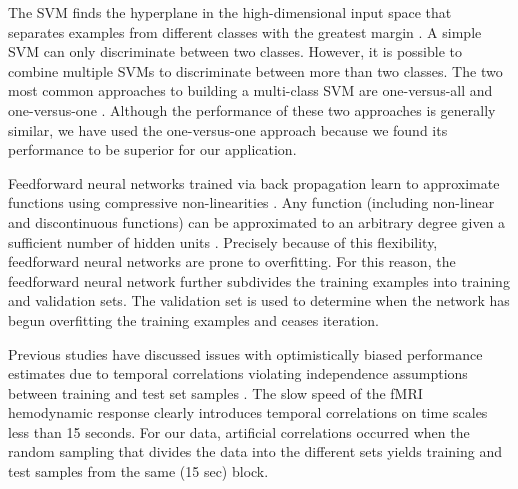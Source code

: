 \documentclass[preprint,5p,authoryear]{elsarticle}
\begin{document}
The SVM finds the hyperplane in the high-dimensional input space that separates examples from different classes with the greatest margin \citep{Cortes1995}.
A simple SVM can only discriminate between two classes.
However, it is possible to combine multiple SVMs to discriminate between more than two classes.
The two most common approaches to building a multi-class SVM are one-versus-all and one-versus-one \citep{Weston1999}.
Although the performance of these two approaches is generally similar, we have used the one-versus-one approach because we found its performance to be superior for our application.

Feedforward neural networks trained via back propagation learn to approximate functions using compressive non-linearities \citep{Hagan1994}.
Any function (including non-linear and discontinuous functions) can be approximated to an arbitrary degree given a sufficient number of hidden units \citep{Hornik1989}.
Precisely because of this flexibility, feedforward neural networks are prone to overfitting.
For this reason, the feedforward neural network further subdivides the training examples into training and validation sets.
The validation set is used to determine when the network has begun overfitting the training examples and ceases iteration.

Previous studies have discussed issues with optimistically biased performance estimates due to temporal correlations violating independence assumptions between training and test set samples \citep{Pereira2009}. The slow speed of the fMRI hemodynamic response clearly introduces temporal correlations on time scales less than 15 seconds.
For our data, artificial correlations occurred when the random sampling that divides the data into the different sets yields training and test samples from the same (15 sec) block.
\end{document}
